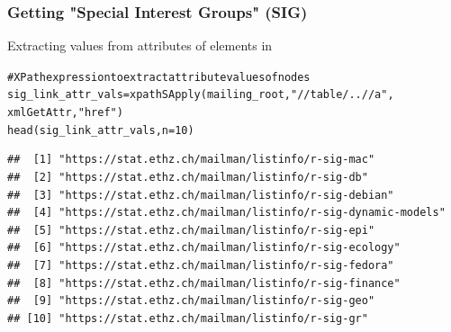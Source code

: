 \documentclass{beamer}\usepackage[]{graphicx}\usepackage[]{color}
\makeatletter
\newcommand{\hlnum}[1]{\textcolor[rgb]{0.063,0.58,0.627}{#1}}%
\newcommand{\hlstr}[1]{\textcolor[rgb]{0.063,0.58,0.627}{#1}}%
\newcommand{\hlcom}[1]{\textcolor[rgb]{0.588,0.588,0.588}{#1}}%
\newcommand{\hlstd}[1]{\textcolor[rgb]{0.196,0.196,0.196}{#1}}%
\newcommand{\hlkwb}[1]{\textcolor[rgb]{0.627,0,0.314}{#1}}%
\newcommand{\hlkwc}[1]{\textcolor[rgb]{0,0.631,0.314}{#1}}%
\newcommand{\hlkwd}[1]{\textcolor[rgb]{0.78,0.227,0.412}{#1}}%
\newenvironment{kframe}{%
 \def\at@end@of@kframe{}%
 \ifinner\ifhmode%
  \def\at@end@of@kframe{\end{minipage}}%
  \begin{minipage}{\columnwidth}%
 \fi\fi%
 \def\FrameCommand##1{\hskip\@totalleftmargin \hskip-\fboxsep
 \colorbox{shadecolor}{##1}\hskip-\fboxsep
     \hskip-\linewidth \hskip-\@totalleftmargin \hskip\columnwidth}%
 \MakeFramed {\advance\hsize-\width
   \@totalleftmargin\z@ \linewidth\hsize
   \@setminipage}}%
 {\par\unskip\endMakeFramed%
 \at@end@of@kframe}
\newenvironment{knitrout}{}{} %
\makeatother
\begin{document}
\begin{frame}[fragile]
\frametitle{Getting "Special Interest Groups" (SIG)}

Extracting values from  attributes of  elements in 
\begin{knitrout}\tiny
{}\color{fgcolor}\begin{kframe}
\begin{alltt}
\hlcom{# XPath expression to extract attribute values of nodes}
\hlstd{sig_link_attr_vals} \hlkwb{=} \hlkwd{xpathSApply}\hlstd{(mailing_root,} \hlstr{"//table/..//a"}\hlstd{,}
                                 \hlstd{xmlGetAttr,} \hlstr{"href"}\hlstd{)}
\hlkwd{head}\hlstd{(sig_link_attr_vals,} \hlkwc{n} \hlstd{=} \hlnum{10}\hlstd{)}
\end{alltt}
\begin{verbatim}
##  [1] "https://stat.ethz.ch/mailman/listinfo/r-sig-mac"           
##  [2] "https://stat.ethz.ch/mailman/listinfo/r-sig-db"            
##  [3] "https://stat.ethz.ch/mailman/listinfo/r-sig-debian"        
##  [4] "https://stat.ethz.ch/mailman/listinfo/r-sig-dynamic-models"
##  [5] "https://stat.ethz.ch/mailman/listinfo/r-sig-epi"           
##  [6] "https://stat.ethz.ch/mailman/listinfo/r-sig-ecology"       
##  [7] "https://stat.ethz.ch/mailman/listinfo/r-sig-fedora"        
##  [8] "https://stat.ethz.ch/mailman/listinfo/r-sig-finance"       
##  [9] "https://stat.ethz.ch/mailman/listinfo/r-sig-geo"           
## [10] "https://stat.ethz.ch/mailman/listinfo/r-sig-gr"
\end{verbatim}
\end{kframe}
\end{knitrout}

\end{frame}

\end{document}

